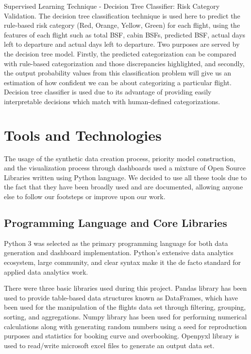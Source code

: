 Supervised Learning Technique - Decision Tree Classifier: Risk Category Validation. The decision tree classification technique is used here to predict the rule-based risk category (Red, Orange, Yellow, Green) for each flight, using the features of each flight such as total BSF, cabin BSFs, predicted BSF, actual days left to departure and actual days left to departure. Two purposes are served by the decision tree model. Firstly, the predicted categorization can be compared with rule-based categorization and those discrepancies highlighted, and secondly, the output probability values from this classification problem will give us an estimation of how confident we can be about categorizing a particular flight. Decision tree classifier is used due to its advantage of providing easily interpretable decisions which match with human-defined categorizations.

\section{Tools and Technologies}

The usage of the synthetic data creation process, priority model construction, and the visualization process through dashboards used a mixture of Open Source Libraries written using Python language. We decided to use all these tools due to the fact that they have been broadly used and are documented, allowing anyone else to follow our footsteps or improve upon our work.

\subsection{Programming Language and Core Libraries}

Python 3 was selected as the primary programming language for both data generation and dashboard implementation. Python's extensive data analytics ecosystem, large community, and clear syntax make it the de facto standard for applied data analytics work.

There were three basic libraries used during this project. Pandas library has been used to provide table-based data structures known as DataFrames, which have been used for the manipulation of the flights data set through filtering, grouping, sorting, and aggregations. Numpy library has been used for performing numerical calculations along with generating random numbers using a seed for reproduction purposes and statistics for booking curve and overbooking. Openpyxl library is used to read/write microsoft excel files to generate an output data set.

